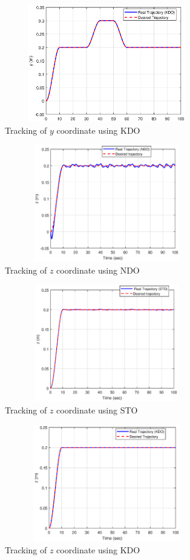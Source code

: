 \documentclass[letterpaper%
, twoside%
, 12pt%
,memoire%
, english%
,creativecommons,hyperref%
]{thETS}
\begin{document}
\begin{figure}[H]
\centering
\includegraphics[width=3.5in,height=2in]{Figures/results/tracking/y_trac_dis_m1_kdo.eps}
\caption{Tracking of $y$ coordinate using KDO}
\label{y_trac_dis_m1_kdo}
\end{figure}

\begin{figure}[H]
\centering
\includegraphics[width=3.5in,height=2in]{Figures/results/tracking/z_trac_dis_m1_ndo.eps}
\caption{Tracking of $z$ coordinate using NDO}
\label{z_trac_dis_m1_ndo}
\end{figure}

\begin{figure}[H]
\centering
\includegraphics[width=3.5in,height=2in]{Figures/results/tracking/z_trac_dis_m1_sto.eps}
\caption{Tracking of $z$ coordinate using STO}
\label{z_trac_dis_m1_sto}
\end{figure}

\begin{figure}[H]
\centering
\includegraphics[width=3.5in,height=2in]{Figures/results/tracking/z_trac_dis_m1_kdo.eps}
\caption{Tracking of $z$ coordinate using KDO}
\label{z_trac_dis_m1_kdo}
\end{figure}
\end{document}
